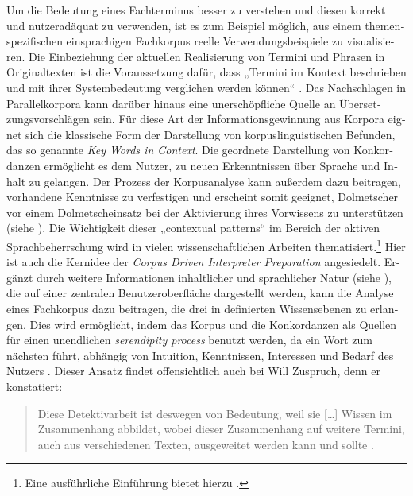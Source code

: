 \documentclass[output=paper]{LSP/langsci}
\begin{document}
\begin{otherlanguage}{ngerman}
Um die Bedeutung eines Fachterminus besser zu verstehen und diesen korrekt und nutzeradäquat zu verwenden, ist es zum Beispiel möglich, aus einem themenspezifischen einsprachigen Fachkorpus reelle Verwendungsbeispiele zu visualisieren. Die Einbeziehung der aktuellen Realisierung von Termini und Phrasen in Originaltexten ist die Voraussetzung dafür, dass „Termini im Kontext beschrieben und mit ihrer Systembedeutung verglichen werden können“ \citep[42]{Will2009}. Das Nachschlagen in Parallelkorpora kann darüber hinaus eine unerschöpfliche Quelle an Übersetzungsvorschlägen sein. Für diese Art der Informationsgewinnung aus Korpora eignet sich die klassische Form der Darstellung von korpuslinguistischen Befunden, das so genannte \textit{Key Words in Context}. Die geordnete Darstellung von Konkordanzen ermöglicht es dem Nutzer, zu neuen Erkenntnissen über Sprache und Inhalt zu gelangen. Der Prozess der Korpusanalyse kann außerdem dazu beitragen, vorhandene Kenntnisse zu verfestigen \citep{Johns1991} und erscheint somit geeignet, Dolmetscher vor einem Dolmetscheinsatz bei der Aktivierung ihres Vorwissens zu unterstützen (siehe ). Die Wichtigkeit dieser „contextual patterns“ \citep[15]{Aston2001} im Bereich der aktiven Sprachbeherrschung wird in vielen wissenschaftlichen Arbeiten thematisiert.\footnote{Eine ausführliche Einführung bietet hierzu \citet{Aston2001}.} Hier ist auch die Kernidee der \textit{Corpus Driven Interpreter Preparation} \citep{Fantinuoli2006} angesiedelt. Ergänzt durch weitere Informationen inhaltlicher und sprachlicher Natur (siehe ), die auf einer zentralen Benutzeroberfläche dargestellt werden, kann die Analyse eines Fachkorpus dazu beitragen, die drei in  definierten Wissensebenen zu erlangen. Dies wird ermöglicht, indem das Korpus und die Konkordanzen als Quellen für einen unendlichen \textit{serendipity process} \citep{Johns1988} benutzt werden, da ein Wort zum nächsten führt, abhängig von Intuition, Kenntnissen, Interessen und Bedarf des Nutzers \citep{Bernardini2001}. Dieser Ansatz findet offensichtlich auch bei Will Zuspruch, denn er konstatiert:

\begin{quote}
Diese Detektivarbeit ist deswegen von Bedeutung, weil sie [\ldots] Wissen im Zusammenhang abbildet, wobei dieser Zusammenhang auf weitere Termini, auch aus verschiedenen Texten, ausgeweitet werden kann und sollte \citep[53]{Will2010}.
\end{quote}


\end{otherlanguage}
\end{document}

